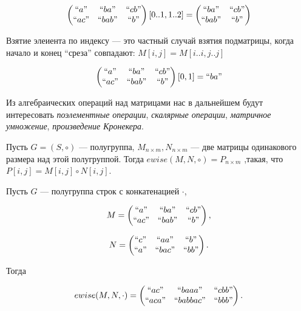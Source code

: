 \begin{example}
$$
\begin{pmatrix}
``a"  & ``ba"  & ``cb" \\
``ac" & ``bab" & ``b"  \\
\end{pmatrix}[0..1,1..2] =
\begin{pmatrix}
``ba"  & ``cb" \\
``bab" & ``b"  \\
\end{pmatrix}
$$
\end{example}


\begin{definition}
Взятие элеиента по индексу --- это частный случай взятия подматрицы, когда начало и конец ``среза'' совпадают:
$
M[i,j] = M[i..i,j..j]
$
\end{definition}

\begin{example}
$$
\begin{pmatrix}
``a"  & ``ba"  & ``cb" \\
``ac" & ``bab" & ``b"  \\
\end{pmatrix}[0,1] = ``ba"
$$
\end{example}

Из алгебраических операций над матрицами нас в дальнейшем будут интересовать \textit{поэлементные операции}, \textit{скалярные операции}, \textit{матричное умножение}, \textit{произведение Кронекера}.


\begin{definition}

Пусть $G = (S,\circ)$ --- полугруппа, $M_{n \times m}, N_{n\times m}$ --- две матрицы одинакового размера над этой полугруппой.
Тогда 
$
ewise(M,N,\circ) = P_{n \times m}
$ 
,такая, что $P[i,j] = M[i,j] \circ N[i,j]$.
\end{definition}


\begin{example}

Пусть $G$ --- полугруппа строк с конкатенацией $\cdot$, 

$$
M = 
\begin{pmatrix}
``a"  & ``ba"  & ``cb" \\
``ac" & ``bab" & ``b"  \\
\end{pmatrix},
$$

$$
N = 
\begin{pmatrix}
``c"  & ``aa"  & ``b" \\
``a" & ``bac" & ``bb"  \\
\end{pmatrix}.
$$

Тогда 

$$
ewise(M,N, \cdot) = 
\begin{pmatrix}
``ac"  & ``baaa"  & ``cbb" \\
``aca" & ``babbac" & ``bbb"  \\
\end{pmatrix}.
$$


\end{example}


